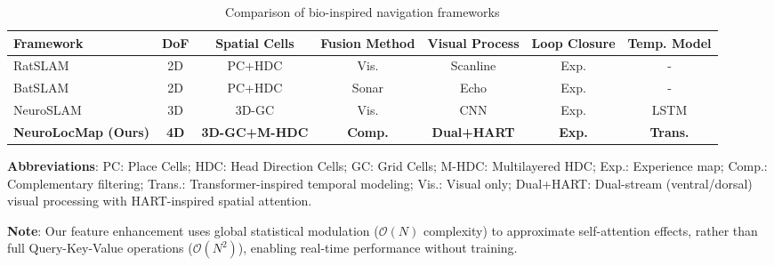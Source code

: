 \begin{table}[!t]
       \centering
       \footnotesize
       \caption{Comparison of bio-inspired navigation frameworks}
       \label{tab:comparison_bioslam}
       \setlength{\tabcolsep}{2.2pt}
       \begin{threeparttable}
              \begin{tabular}{lcccccc}
                     \toprule
                     Framework                         & DoF         & Spatial Cells        & Fusion Method  & Visual Process     & Loop Closure  & Temp. Model     \\
                     \midrule
                     RatSLAM~\cite{milford2008mapping} & 2D          & PC+HDC               & Vis.           & Scanline           & Exp.          & -               \\
                     BatSLAM~\cite{steckel2013batslam} & 2D          & PC+HDC               & Sonar          & Echo               & Exp.          & -               \\
                     NeuroSLAM                         & 3D          & 3D-GC                & Vis.           & CNN                & Exp.          & LSTM            \\
                     \midrule
                     \textbf{NeuroLocMap (Ours)}       & \textbf{4D} & \textbf{3D-GC+M-HDC} & \textbf{Comp.} & \textbf{Dual+HART} & \textbf{Exp.} & \textbf{Trans.} \\
                     \bottomrule
              \end{tabular}
              \begin{tablenotes}
                     \scriptsize
                     \item \textbf{Abbreviations}: PC: Place Cells; HDC: Head Direction Cells; GC: Grid Cells; M-HDC: Multilayered HDC; Exp.: Experience map; Comp.: Complementary filtering; Trans.: Transformer-inspired temporal modeling; Vis.: Visual only; Dual+HART: Dual-stream (ventral/dorsal) visual processing with HART-inspired spatial attention.
                     \item \textbf{Note}: Our feature enhancement uses global statistical modulation ($\mathcal{O}(N)$ complexity) to approximate self-attention effects, rather than full Query-Key-Value operations ($\mathcal{O}(N^2)$), enabling real-time performance without training.
              \end{tablenotes}
       \end{threeparttable}
\end{table}
